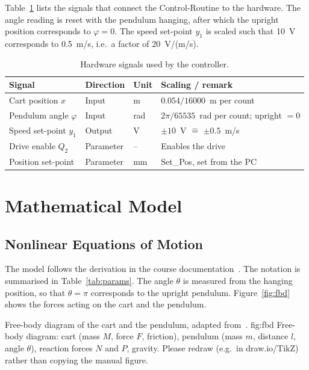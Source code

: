 Table~\ref{tab:signals} lists the signals that connect the Control-Routine to
the hardware. The angle reading is reset with the pendulum hanging, after
which the upright position corresponds to $\varphi = 0$. The speed set-point
$y_1$ is scaled such that 10~V corresponds to 0.5~m/s, i.e.\ a factor of
20~V/(m/s).

\begin{table}[ht]
\centering
\caption{Hardware signals used by the controller.}
\label{tab:signals}
\begin{tabular}{llll}
\toprule
Signal & Direction & Unit & Scaling / remark \\
\midrule
Cart position $x$ & Input & m & $0.054/16000$~m per count \\
Pendulum angle $\varphi$ & Input & rad & $2\pi/65535$~rad per count; upright $= 0$ \\
Speed set-point $y_1$ & Output & V & $\pm 10$~V $\hat{=}$ $\pm 0.5$~m/s \\
Drive enable $Q_2$ & Parameter & -- & Enables the drive \\
Position set-point & Parameter & mm & Set\_Pos, set from the PC \\
\bottomrule
\end{tabular}
\end{table}

\section{Mathematical Model}
\label{sec:model}

\subsection{Nonlinear Equations of Motion}
\label{subsec:nonlinear}

The model follows the derivation in the course documentation~\cite{ln_manual}.
The notation is summarised in Table~\ref{tab:params}. The angle $\theta$ is
measured from the hanging position, so that $\theta = \pi$ corresponds to the
upright pendulum. Figure~\ref{fig:fbd} shows the forces acting on the cart and
the pendulum.

  {Free-body diagram of the cart and the pendulum, adapted from~\cite{ln_manual}.}
  {fig:fbd}
  {Free-body diagram: cart (mass $M$, force $F$, friction), pendulum (mass $m$, distance $l$, angle $\theta$), reaction forces $N$ and $P$, gravity. Please redraw (e.g.\ in draw.io/TikZ) rather than copying the manual figure.}

